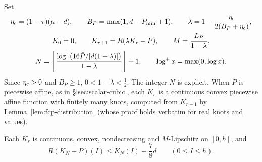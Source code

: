 Set
\begin{gather}\label{eq:scalar-iteration}
 \eta_{\rm c}=(1-\tau)(\mu-d),\qquad B_P=\max(1,d-P_{\min}+1),\qquad
 \lambda=1-\frac{\eta_{\rm c}}{2(B_P+\eta_{\rm c})},\\
 K_0=0,\qquad K_{r+1}=R(\lambda K_r-P),\qquad
 M=\frac{L_P}{1-\lambda},\notag\\
 N=\left\lfloor\frac{\log^+\!\bigl(16\bar P/[d(1-\lambda)]\bigr)}{1-\lambda}\right\rfloor+1,
 \qquad \log^+x=\max(0,\log x).\notag
\end{gather}
Since $\eta_{\rm c}>0$ and $B_P\ge1$, $0<1-\lambda<\frac12$. The integer $N$ is explicit. When $P$ is piecewise
affine, as in \S\ref{sec:scalar-cubic}, each $K_r$ is a continuous convex piecewise affine function with finitely many
knots, computed from $K_{r-1}$ by Lemma~\ref{lem:fcp-distribution} (whose proof holds verbatim for real knots and
values).

\begin{lemma}\label{lem:scalar-finite-gap}
Each $K_r$ is continuous, convex, nondecreasing and $M$-Lipschitz on $[0,h]$, and
\begin{equation}\label{eq:scalar-KN-gap}
 R(K_N-P)(I)\le K_N(I)-\frac78d\qquad(0\le I\le h).
\end{equation}
{\normalfont {}}
\end{lemma}


